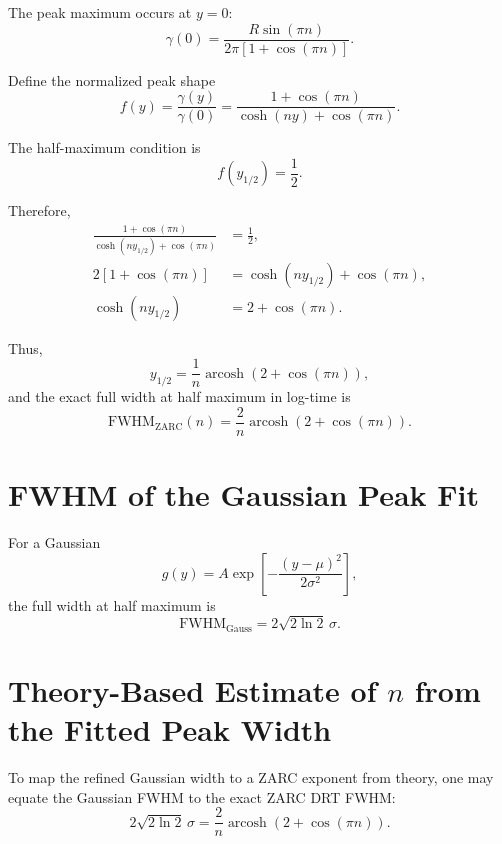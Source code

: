 \documentclass[11pt]{article}
\begin{document}
The peak maximum occurs at $y=0$:
\begin{equation}
\gamma(0) = \frac{R\sin(\pi n)}{2\pi[1 + \cos(\pi n)]}.
\end{equation}

Define the normalized peak shape
\begin{equation}
f(y) = \frac{\gamma(y)}{\gamma(0)} = \frac{1 + \cos(\pi n)}{\cosh(ny) + \cos(\pi n)}.
\end{equation}

The half-maximum condition is
\begin{equation}
f(y_{1/2}) = \frac{1}{2}.
\end{equation}

Therefore,
\begin{align}
\frac{1 + \cos(\pi n)}{\cosh(ny_{1/2}) + \cos(\pi n)} &= \frac{1}{2}, \\
2[1 + \cos(\pi n)] &= \cosh(ny_{1/2}) + \cos(\pi n), \\
\cosh(ny_{1/2}) &= 2 + \cos(\pi n).
\end{align}

Thus,
\begin{equation}
y_{1/2} = \frac{1}{n} \operatorname{arcosh}\left(2 + \cos(\pi n)\right),
\end{equation}
and the exact full width at half maximum in log-time is
\begin{equation}
\boxed{\mathrm{FWHM}_{\mathrm{ZARC}}(n) = \frac{2}{n} \operatorname{arcosh}\left(2 + \cos(\pi n)\right)}.
\end{equation}

\section{FWHM of the Gaussian Peak Fit}

For a Gaussian
\begin{equation}
g(y) = A \exp\left[-\frac{(y-\mu)^2}{2\sigma^2}\right],
\end{equation}
the full width at half maximum is
\begin{equation}
\boxed{\mathrm{FWHM}_{\mathrm{Gauss}} = 2\sqrt{2\ln 2}\,\sigma}.
\end{equation}

\section{Theory-Based Estimate of $n$ from the Fitted Peak Width}

To map the refined Gaussian width to a ZARC exponent from theory, one may equate the Gaussian FWHM to the exact ZARC DRT FWHM:
\begin{equation}
2\sqrt{2\ln 2}\,\sigma = \frac{2}{n} \operatorname{arcosh}\left(2 + \cos(\pi n)\right).
\end{equation}
\end{document}
